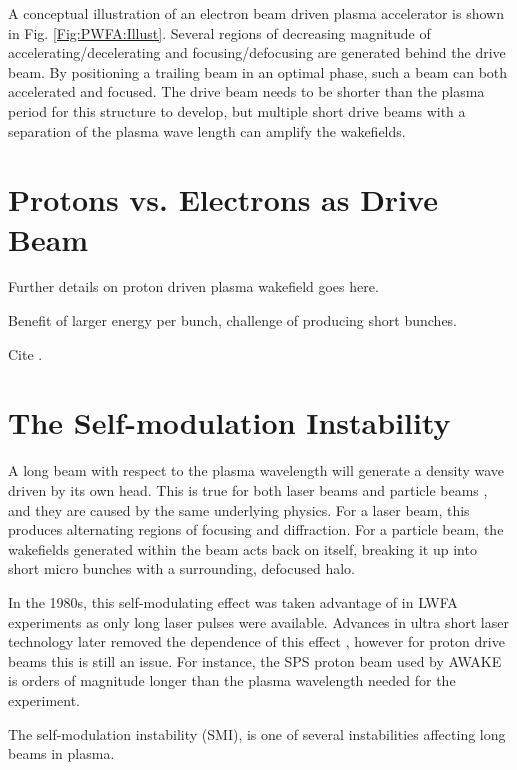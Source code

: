 A conceptual illustration of an electron beam driven plasma accelerator is shown in Fig. \ref{Fig:PWFA:Illust}. Several regions of decreasing magnitude of accelerating/decelerating and focusing/defocusing are generated behind the drive beam. By positioning a trailing beam in an optimal phase, such a beam can both accelerated and focused. The drive beam needs to be shorter than the plasma period for this structure to develop, but multiple short drive beams with a separation of the plasma wave length can amplify the wakefields.

\section{Protons vs. Electrons as Drive Beam}
\label{Int:PDPWFA}

Further details on proton driven plasma wakefield goes here.

Benefit of larger energy per bunch, challenge of producing short bunches.

Cite \cite{adli:2016a}.

\section{The Self-modulation Instability}
\label{Int:SMI}

A long beam with respect to the plasma wavelength will generate a density wave driven by its own head. This is true for both laser beams \cite{esarey:1994} and particle beams \cite{kumar:2010}, and they are caused by the same underlying physics. For a laser beam, this produces alternating regions of focusing and diffraction. For a particle beam, the wakefields generated within the beam acts back on itself, breaking it up into short micro bunches with a surrounding, defocused halo.

In the 1980s, this self-modulating effect was taken advantage of in LWFA experiments as only long laser pulses were available. Advances in ultra short laser technology later removed the dependence of this effect \cite{pukhov:2002}, however for proton drive beams this is still an issue. For instance, the SPS proton beam used by AWAKE is orders of magnitude longer than the plasma wavelength needed for the experiment.

The self-modulation instability (SMI), is one of several instabilities affecting long beams in plasma.

